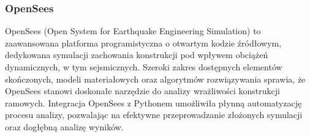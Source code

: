 \subsubsection{OpenSees}

OpenSees (Open System for Earthquake Engineering Simulation) to zaawansowana platforma programistyczna o otwartym kodzie źródłowym, dedykowana symulacji zachowania konstrukcji pod wpływem obciążeń dynamicznych, w tym sejsmicznych\cite{opensees}.
Szeroki zakres dostępnych elementów skończonych, modeli materiałowych oraz algorytmów rozwiązywania sprawia, że OpenSees stanowi doskonałe narzędzie do analizy wrażliwości konstrukcji ramowych.
Integracja OpenSees z Pythonem umożliwiła płynną automatyzację procesu analizy, pozwalając na efektywne przeprowadzanie złożonych symulacji oraz dogłębną analizę wyników.